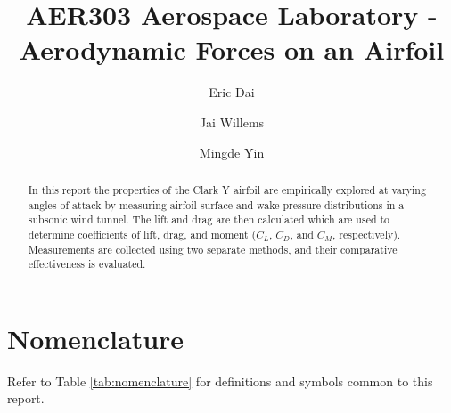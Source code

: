 \documentclass[runningheads]{llncs}
\begin{document}
\title{AER303 Aerospace Laboratory - Aerodynamic Forces on an Airfoil}

\author{Eric Dai \and Jai Willems \and Mingde Yin}


\maketitle




\begin{abstract}

In this report the properties of the Clark Y airfoil are empirically explored at varying angles of attack by measuring airfoil surface and wake pressure distributions in a subsonic wind tunnel. The lift and drag are then calculated which are used to determine coefficients of lift, drag, and moment ($C_L$, $C_D$, and $C_M$, respectively). Measurements are collected using two separate methods, and their comparative effectiveness is evaluated.

\end{abstract}




\section{Nomenclature}

Refer to Table \ref{tab:nomenclature} for definitions and symbols common to this report.
\end{document}
